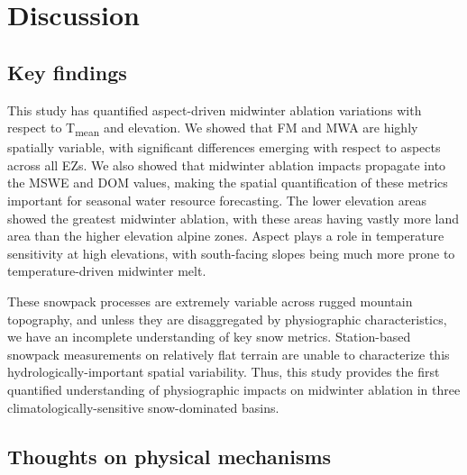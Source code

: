 \hypertarget{ch2-discussion}{\section{Discussion}\label{ch2-discussion}}
\hypertarget{ch2-discussion}{\subsection{Key findings}\label{ch2-discussion}}


This study has quantified aspect-driven midwinter ablation variations with respect to T\textsubscript{mean} and elevation. We showed that FM and MWA are highly spatially variable, with significant differences emerging with respect to aspects across all EZs. We also showed that midwinter ablation impacts propagate into the MSWE and DOM values, making the spatial quantification of these metrics important for seasonal water resource forecasting. The lower elevation areas showed the greatest midwinter ablation, with these areas having vastly more land area than the higher elevation alpine zones. Aspect plays a role in temperature sensitivity at high elevations, with south-facing slopes being much more prone to temperature-driven midwinter melt.

These snowpack processes are extremely variable across rugged mountain topography, and unless they are disaggregated by physiographic characteristics, we have an incomplete understanding of key snow metrics. Station-based snowpack measurements on relatively flat terrain are unable to characterize this hydrologically-important spatial variability. Thus, this study provides the first quantified understanding of physiographic impacts on midwinter ablation in three climatologically-sensitive snow-dominated basins. 


\hypertarget{ch2-discussion}{\subsection{Thoughts on physical mechanisms}\label{ch2-discussion}}


